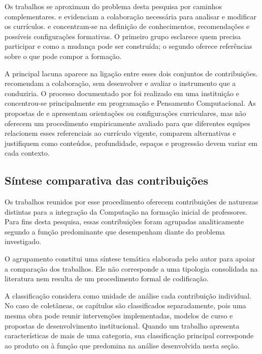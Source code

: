 Os trabalhos se aproximam do problema desta pesquisa por caminhos complementares.  e  evidenciam a colaboração necessária para analisar e modificar os currículos.  e  concentram-se na definição de conhecimentos, recomendações e possíveis configurações formativas. O primeiro grupo esclarece quem precisa participar e como a mudança pode ser construída; o segundo oferece referências sobre o que pode compor a formação.

A principal lacuna aparece na ligação entre esses dois conjuntos de contribuições.  recomendam a colaboração, sem desenvolver e avaliar o instrumento que a conduziria. O processo documentado por  foi realizado em uma instituição e concentrou-se principalmente em programação e Pensamento Computacional. As propostas de  e  apresentam orientações ou configurações curriculares, mas não oferecem um procedimento empiricamente avaliado para que diferentes equipes relacionem esses referenciais ao currículo vigente, comparem alternativas e justifiquem como conteúdos, profundidade, espaços e progressão devem variar em cada contexto.

\subsection{Síntese comparativa das contribuições}
\label{subsec:sintese-comparativa-literatura}

Os trabalhos reunidos por esse procedimento oferecem contribuições de naturezas distintas para a integração da Computação na formação inicial de professores. Para fins desta pesquisa, essas contribuições foram agrupadas analiticamente segundo a função predominante que desempenham diante do problema investigado.

O agrupamento constitui uma síntese temática elaborada pelo autor para apoiar a comparação dos trabalhos. Ele não corresponde a uma tipologia consolidada na literatura nem resulta de um procedimento formal de codificação.

A classificação considera como unidade de análise cada contribuição individual. No caso de coletâneas, os capítulos são classificados separadamente, pois uma mesma obra pode reunir intervenções implementadas, modelos de curso e propostas de desenvolvimento institucional. Quando um trabalho apresenta características de mais de uma categoria, sua classificação principal corresponde ao produto ou à função que predomina na análise desenvolvida nesta seção.

